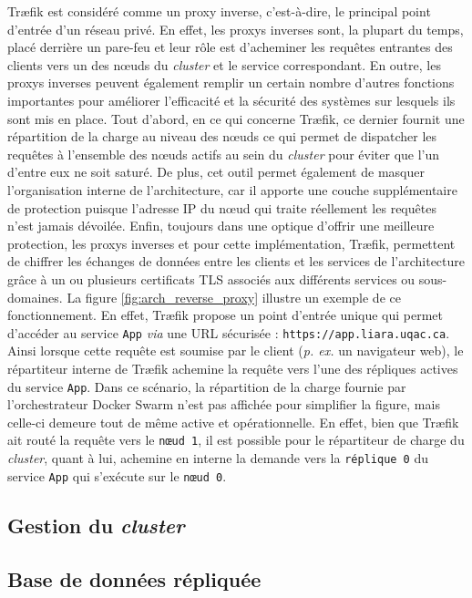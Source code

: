 Tr\ae{}fik est considéré comme un proxy inverse, c'est-à-dire, le principal point d'entrée d'un réseau privé. En effet, les proxys inverses sont, la plupart du temps, placé derrière un pare-feu et leur rôle est d'acheminer les requêtes entrantes des clients vers un des n\oe{}uds du \textit{cluster} et le service correspondant. En outre, les proxys inverses peuvent également remplir un certain nombre d'autres fonctions importantes pour améliorer l'efficacité et la sécurité des systèmes sur lesquels ils sont mis en place. Tout d'abord, en ce qui concerne Tr\ae{}fik, ce dernier fournit une répartition de la charge au niveau des n\oe{}uds ce qui permet de dispatcher les requêtes à l'ensemble des n\oe{}uds actifs au sein du \textit{cluster} pour éviter que l'un d'entre eux ne soit saturé. De plus, cet outil permet également de masquer l'organisation interne de l'architecture, car il apporte une couche supplémentaire de protection puisque l'adresse IP du n\oe{}ud qui traite réellement les requêtes n'est jamais dévoilée. Enfin, toujours dans une optique d'offrir une meilleure protection, les proxys inverses et pour cette implémentation, Tr\ae{}fik, permettent de chiffrer les échanges de données entre les clients et les services de l'architecture grâce à un ou plusieurs certificats \acs{TLS} associés aux différents services ou sous-domaines. La figure \ref{fig:arch_reverse_proxy} illustre un exemple de ce fonctionnement. En effet, Tr\ae{}fik propose un point d'entrée unique qui permet d'accéder au service \texttt{App} \textit{via} une \acs{URL} sécurisée : \texttt{https://app.liara.uqac.ca}. Ainsi lorsque cette requête est soumise par le client (\textit{p. ex. } un navigateur web), le répartiteur interne de Tr\ae{}fik achemine la requête vers l'une des répliques actives du service \texttt{App}. Dans ce scénario, la répartition de la charge fournie par l'orchestrateur Docker Swarm n'est pas affichée pour simplifier la figure, mais celle-ci demeure tout de même active et opérationnelle. En effet, bien que Tr\ae{}fik ait routé la requête vers le \texttt{n\oe{}ud 1}, il est possible pour le répartiteur de charge du \textit{cluster}, quant à lui, achemine en interne la demande vers la \texttt{réplique 0} du service \texttt{App} qui s'exécute sur le \texttt{n\oe{}ud 0}.

\subsection{Gestion du \textit{cluster}}

\subsection{Base de données répliquée}

